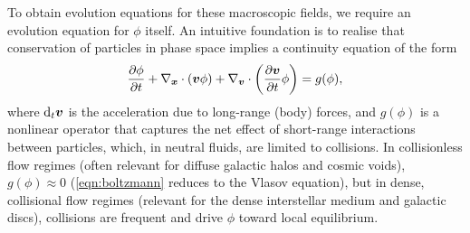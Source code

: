 To obtain evolution equations for these macroscopic fields, we require an evolution equation for $\phi$ itself. An intuitive foundation is to realise that conservation of particles in phase space implies a continuity equation of the form
\begin{align}
    \frac{\partial \phi}{\partial t}
        + \nabla_{\bm{x}} \cdot \left( \bm{v} \phi \right)
        + \nabla_{\bm{v}} \cdot \left( \frac{\partial \bm{v}}{\partial t} \phi \right)
        = g(\phi)
        ,  \label{eqn:boltzmann}
\end{align}
where $\mathrm{d} _t \bm{v}$ is the acceleration due to long-range (body) forces, and $g(\phi)$ is a nonlinear operator that captures the net effect of short-range interactions between particles, which, in neutral fluids, are limited to collisions. In collisionless flow regimes (often relevant for diffuse galactic halos and cosmic voids), $g(\phi) \approx 0$ (\autoref{eqn:boltzmann} reduces to the Vlasov equation), but in dense, collisional flow regimes (relevant for the dense interstellar medium and galactic discs), collisions are frequent and drive $\phi$ toward local equilibrium.

